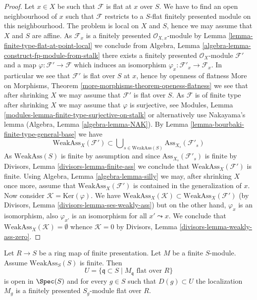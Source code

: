 \begin{proof}
Let $x \in X$ be such that $\mathcal{F}$ is flat at $x$ over $S$.
We have to find an open neighbourhood of $x$ such that $\mathcal{F}$ restricts
to a $S$-flat finitely presented module on this neighbourhood.
The problem is local on $X$ and $S$, hence we may assume that $X$ and $S$
are affine. As $\mathcal{F}_x$ is a finitely presented
$\mathcal{O}_{X, x}$-module by
Lemma \ref{lemma-finite-type-flat-at-point-local}
we conclude from
Algebra, Lemma \ref{algebra-lemma-construct-fp-module-from-stalk}
there exists a finitely presented $\mathcal{O}_X$-module $\mathcal{F}'$
and a map $\varphi : \mathcal{F}' \to \mathcal{F}$ which induces
an isomorphism $\varphi_x : \mathcal{F}'_x \to \mathcal{F}_x$. In particular
we see that $\mathcal{F}'$ is flat over $S$ at $x$, hence by openness
of flatness
More on Morphisms, Theorem \ref{more-morphisms-theorem-openess-flatness}
we see that after shrinking $X$ we may assume that
$\mathcal{F}'$ is flat over $S$. As $\mathcal{F}$ is of finite type
after shrinking $X$ we may assume that $\varphi$ is surjective, see
Modules, Lemma \ref{modules-lemma-finite-type-surjective-on-stalk}
or alternatively use Nakayama's lemma
(Algebra, Lemma \ref{algebra-lemma-NAK}).
By
Lemma \ref{lemma-bourbaki-finite-type-general-base}
we have
$$
\text{WeakAss}_X(\mathcal{F}') \subset
\bigcup\nolimits_{s \in \text{WeakAss}(S)} \text{Ass}_{X_s}(\mathcal{F}'_s)
$$
As $\text{WeakAss}(S)$ is finite by assumption and since
$\text{Ass}_{X_s}(\mathcal{F}'_s)$ is finite by
Divisors, Lemma \ref{divisors-lemma-finite-ass}
we conclude that $\text{WeakAss}_X(\mathcal{F}')$ is finite. Using
Algebra, Lemma \ref{algebra-lemma-silly}
we may, after shrinking $X$ once more, assume that
$\text{WeakAss}_X(\mathcal{F}')$ is contained in the generalization
of $x$. Now consider $\mathcal{K} = \text{Ker}(\varphi)$. We have
$\text{WeakAss}_X(\mathcal{K}) \subset \text{WeakAss}_X(\mathcal{F}')$
(by
Divisors, Lemma \ref{divisors-lemma-ses-weakly-ass})
but on the other hand, $\varphi_x$ is an isomorphism, also $\varphi_{x'}$
is an isomorphism for all $x' \leadsto x$. We conclude that
$\text{WeakAss}_X(\mathcal{K}) = \emptyset$ whence
$\mathcal{K} = 0$ by
Divisors, Lemma \ref{divisors-lemma-weakly-ass-zero}.
\end{proof}

\begin{lemma}
\label{lemma-finite-type-flat-algebra}
Let $R \to S$ be a ring map of finite presentation.
Let $M$ be a finite $S$-module. Assume $\text{WeakAss}_S(S)$ is finite.
Then
$$
U = \{\mathfrak q \subset S \mid M_{\mathfrak q}\text{ flat over }R\}
$$
is open in $\Spec(S)$ and for every $g \in S$ such that
$D(g) \subset U$ the localization $M_g$ is a finitely presented
$S_g$-module flat over $R$.
\end{lemma}

